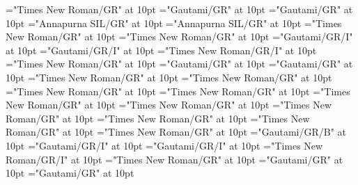 \documentclass[a4paper]{article}
\begin{document}
\font\xsensenumbersensesensesentryletData="Times New Roman/GR" at 10pt
\font\xitemteLexSensepublishStemGlossPubLdtesensesensesentryletData="Gautami/GR" at 10pt
\font\spantexitemteLexSensepublishStemGlossPubLdtesensesensesentryletData="Gautami/GR" at 10pt
\font\xitemhiLexSensepublishStemGlossPubLdtesensesensesentryletData="Annapurna SIL/GR" at 10pt
\font\spanhixitemhiLexSensepublishStemGlossPubLdtesensesensesentryletData="Annapurna SIL/GR" at 10pt
\font\examplessensesensesentryletData="Times New Roman/GR" at 10pt
\font\xitemexamplessensesensesentryletData="Times New Roman/GR" at 10pt
\font\exampleggoTeluINxitemexamplessensesensesentryletData="Gautami/GR/I" at 10pt
\font\spanggoTeluINexampleggoTeluINxitemexamplessensesensesentryletData="Gautami/GR/I" at 10pt
\font\spanenexampleggoTeluINxitemexamplessensesensesentryletData="Times New Roman/GR/I" at 10pt
\font\translationsxitemexamplessensesensesentryletData="Times New Roman/GR" at 10pt
\font\translationLdtetranslationsxitemexamplessensesensesentryletData="Gautami/GR" at 10pt
\font\spantetranslationLdtetranslationsxitemexamplessensesensesentryletData="Gautami/GR" at 10pt
\font\spanentranslationLdtetranslationsxitemexamplessensesensesentryletData="Times New Roman/GR" at 10pt
\font\spanenexamplessensesensesentryletData="Times New Roman/GR" at 10pt
\font\primaryrefsentryletData="Times New Roman/GR" at 10pt
\font\spanenprimaryrefsentryletData="Times New Roman/GR" at 10pt
\font\entryreftypeprimaryrefsentryletData="Times New Roman/GR" at 10pt
\font\LexEntryTypepublishStemEntryTypeAbbreviationPubenentryreftypeprimaryrefsentryletData="Times New Roman/GR" at 10pt
\font\spanenLexEntryTypepublishStemEntryTypeAbbreviationPubenentryreftypeprimaryrefsentryletData="Times New Roman/GR" at 10pt
\font\spanenentryreftypeprimaryrefsentryletData="Times New Roman/GR" at 10pt
\font\entryrefcomponentprimaryrefsentryletData="Times New Roman/GR" at 10pt
\font\aentryrefcomponentprimaryrefsentryletData="Times New Roman/GR" at 10pt
\font\LexEntrypublishStemComponentTargetHeadWordRefggoTeluINaentryrefcomponentprimaryrefsentryletData="Gautami/GR/B" at 10pt
\font\exampleggoTeluINexamplessensesensesentryletData="Gautami/GR/I" at 10pt
\font\spanggoTeluINexampleggoTeluINexamplessensesensesentryletData="Gautami/GR/I" at 10pt
\font\spanenexampleggoTeluINexamplessensesensesentryletData="Times New Roman/GR/I" at 10pt
\font\translationsexamplessensesensesentryletData="Times New Roman/GR" at 10pt
\font\translationLdtetranslationsexamplessensesensesentryletData="Gautami/GR" at 10pt
\font\spantetranslationLdtetranslationsexamplessensesensesentryletData="Gautami/GR" at 10pt
\end{document}
